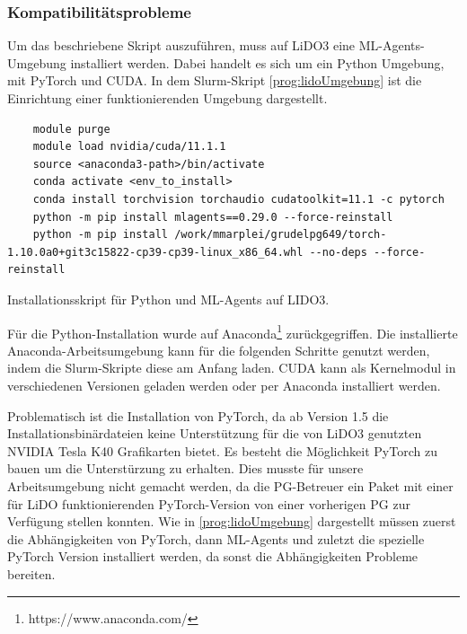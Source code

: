 \subsubsection{Kompatibilitätsprobleme}
Um das beschriebene Skript auszuführen, muss auf LiDO3 eine ML-Agents-Umgebung installiert werden. Dabei handelt es sich um ein Python Umgebung, mit PyTorch und CUDA. In dem Slurm-Skript \ref{prog:lidoUmgebung} ist die Einrichtung einer funktionierenden Umgebung dargestellt. 

\begin{listing}
	\begin{verbatim}
	module purge
	module load nvidia/cuda/11.1.1
	source <anaconda3-path>/bin/activate
	conda activate <env_to_install>
	conda install torchvision torchaudio cudatoolkit=11.1 -c pytorch
	python -m pip install mlagents==0.29.0 --force-reinstall
	python -m pip install /work/mmarplei/grudelpg649/torch-1.10.0a0+git3c15822-cp39-cp39-linux_x86_64.whl --no-deps --force-reinstall 
	\end{verbatim}
	\caption{Installationsskript für Python und ML-Agents auf LIDO3.}
	\label{prog:lidoUmgebung}
\end{listing}

Für die Python-Installation wurde auf Anaconda\footnote{https://www.anaconda.com/} zurückgegriffen. Die installierte Anaconda-Arbeitsumgebung kann für die folgenden Schritte genutzt werden, indem die Slurm-Skripte diese am Anfang laden. CUDA kann als Kernelmodul in verschiedenen Versionen geladen werden oder per Anaconda installiert werden.

Problematisch ist die Installation von PyTorch, da ab Version 1.5 die Installationsbinärdateien keine Unterstützung für die von LiDO3 genutzten NVIDIA Tesla K40 Grafikarten bietet. Es besteht die Möglichkeit PyTorch zu bauen um die Unterstürzung zu erhalten. Dies musste für unsere Arbeitsumgebung nicht gemacht werden, da die PG-Betreuer ein Paket mit einer für LiDO funktionierenden PyTorch-Version von einer vorherigen PG zur Verfügung stellen konnten. Wie in \ref{prog:lidoUmgebung} dargestellt müssen zuerst die Abhängigkeiten von PyTorch, dann ML-Agents und zuletzt die spezielle PyTorch Version installiert werden, da sonst die Abhängigkeiten Probleme bereiten.

